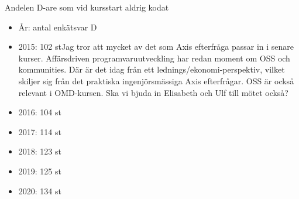 \documentclass{lecturesimple}
\begin{document}
\begin{Slide}{Andelen D-are som vid kursstart aldrig kodat}
\dataSeq

\begin{minipage}{0.65\textwidth}
\hspace*{-0.65cm}%
\end{minipage}%
\begin{minipage}{0.3\textwidth}
\begin{itemize}\SlideFontTiny
\item[] År: antal enkätsvar D
\item[] 2015: 102 stJag tror att mycket av det som Axis efterfråga passar in i senare kurser. Affärsdriven programvaruutveckling har redan moment om OSS och kommunities. Där är det idag från ett lednings/ekonomi-perspektiv, vilket skiljer sig från det praktiska ingenjörsmässiga Axis efterfrågar. OSS är också relevant i OMD-kursen. Ska vi bjuda in Elisabeth och Ulf till mötet också?

\item[] 2016: 104 st
\item[] 2017: 114 st
\item[] 2018: 123 st
\item[] 2019: 125 st 
\item[] 2020: 134 st 
\end{itemize}
\end{minipage}%
\end{Slide}
\end{document}
